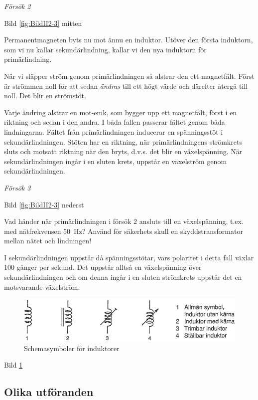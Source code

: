 \emph{Försök 2}

Bild \ref{fig:BildII2-3} mitten

Permanentmagneten byts nu mot ännu en induktor. Utöver den första induktorn, som
vi nu kallar sekundärlindning, kallar vi den nya induktorn för primärlindning.

När vi släpper ström genom primärlindningen så alstrar den ett magnetfält. Först
är strömmen noll för att sedan \emph{ändras} till ett högt värde och därefter
återgå till noll. Det blir en strömstöt.

Varje ändring alstrar en mot-emk, som bygger upp ett magnetfält, först i en
riktning och sedan i den andra. I båda fallen passerar fältet genom båda
lindningarna. Fältet från primärlindningen inducerar en spänningsstöt i
sekundärlindningen. Stöten har en riktning, när primärlindningens strömkrets
sluts och motsatt riktning när den bryts, d.v.s. det blir en växelspänning.
När sekundärlindningen ingår i en sluten krets, uppstår en växelström genom
sekundärlindningen.

\emph{Försök 3}


Bild \ref{fig:BildII2-3} nederst

Vad händer när primärlindningen i försök 2 ansluts till en växelspänning, t.ex.
med nätfrekvensen 50~Hz? Använd för säkerhets skull en skyddstransformator
mellan nätet och lindningen!

I sekundärlindningen uppstår då spänningsstötar, vars polaritet i detta fall
växlar 100 gånger per sekund. Det uppstår alltså en växelspänning över
sekundärlindningen och om denna ingår i en sluten strömkrets uppstår det en
motsvarande växelström.


\begin{figure}
\includegraphics[width=\textwidth]{images/cropped_pdfs/bild_2_2-04.pdf}
\caption{Schemasymboler för induktorer}
\label{fig:BildII2-4}
\end{figure}

Bild \ref{fig:BildII2-4}

\subsection{Olika utföranden}

